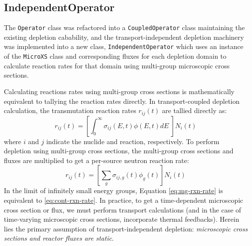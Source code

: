     \subsection{IndependentOperator}
        The \verb.Operator. class was refactored into a \verb.CoupledOperator.
        class maintaining the existing depletion cabability, and the
        transport-independent depletion machinery was implemented into a new
        class, \verb.IndependentOperator. which uses an instance of the
        \verb.MicroXS. class and corresponding fluxes for each depletion domain
        to calculate reaction rates for that domain using multi-group microscopic
        cross sections.

        Calculating reactions rates using multi-group cross sections is
        mathematically equivalent to tallying the reaction rates directly. In
        transport-coupled depletion calculation, the transmutation reaction
        rates $r_{ij}(t)$ are tallied directly as:
        \begin{equation}
            \label{eq:cont-rxn-rate}
            r_{ij}(t) = \left[\int_0^\infty \sigma_{ij}(E,t) \phi(E,t) dE \; \right]
            N_{i}(t)
        \end{equation}
        where $i$ and $j$ indicate the nuclide and reaction, respectively.
            To perform depletion using multi-group cross sections, the multi-group
        cross sections and fluxes are multiplied to get a per-source neutron
        reaction rate:
        \begin{equation}
            \label{eq:mg-rxn-rate}
            r_{ij}(t) = \left[\sum_{g} \sigma_{ij,g}(t) \phi_{g}(t) \right]
            N_{i}(t) 
        \end{equation}
        In the limit of infinitely small energy groups, Equation
        \ref{eq:mg-rxn-rate} is equivalent to \ref{eq:cont-rxn-rate}. In
        practice, to get a time-dependent microscopic cross section or flux, we
        must perform transport calculations (and in the case of time-varying
        microscopic cross sections, incorporate thermal feedbacks). Herein lies
        the primary assumption of transport-independent depletion: {\it
        microscopic cross sections and reactor fluxes are static}.

